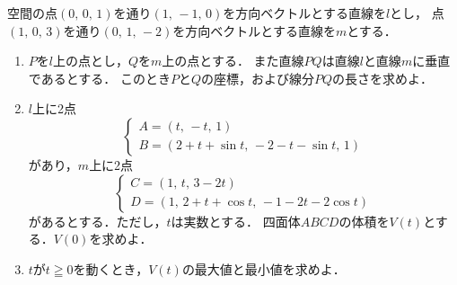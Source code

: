 \documentclass[../../main.tex]{subfiles}
\begin{document}
空間の点$(0, \, 0, \, 1)$を通り$(1, \, -1, \, 0)$を方向ベクトルとする直線を$l$とし，
点$(1, \, 0, \, 3)$を通り$(0, \, 1, \, -2)$を方向ベクトルとする直線を$m$とする．
\begin{enumerate}
  \item$P$を$l$上の点とし，$Q$を$m$上の点とする．
    また直線$PQ$は直線$l$と直線$m$に垂直であるとする．
    このとき$P$と$Q$の座標，および線分$PQ$の長さを求めよ．
  \item$l$上に2点
    \[
      \begin{cases} A=(t, \, -t, \, 1) \\
        B=(2+t+\sin t, \, -2-t-\sin t, \, 1)
    \end{cases} \]
    があり，$m$上に2点
    \[
      \begin{cases} C=(1, \, t, \, 3-2t) \\
        D=(1, \, 2+t+\cos t, \, -1-2t-2\cos t)
    \end{cases} \]
    があるとする．ただし，$t$は実数とする．
    四面体$ABCD$の体積を$V(t)$とする．$V(0)$を求めよ．
  \item$t$が$t\geqq0$を動くとき，$V(t)$の最大値と最小値を求めよ．
\end{enumerate}
\end{document}
